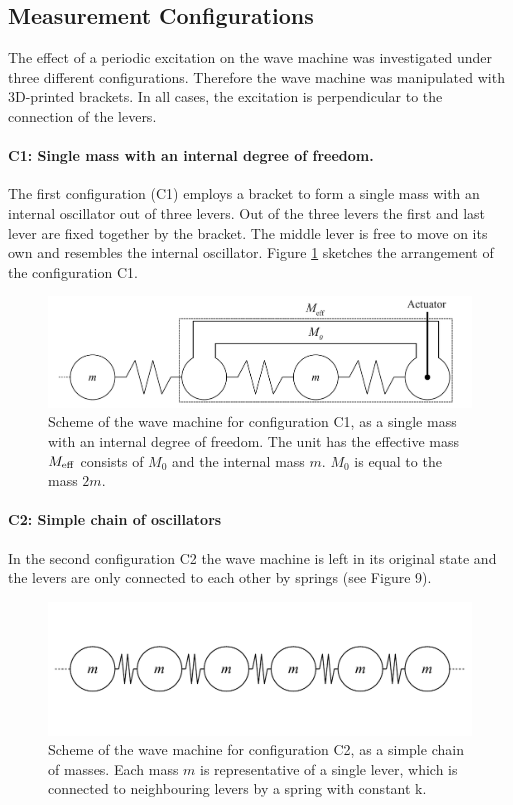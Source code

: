 \documentclass[12pt]{article}
\begin{document}
\subsection{Measurement Configurations}
The effect of a periodic excitation on the wave machine was investigated under three different configurations. Therefore the wave machine was manipulated with 3D-printed brackets. In all cases, the excitation is perpendicular to the connection of the levers.

\paragraph{C1: Single mass with an internal degree of freedom.} The first configuration (C1) employs a bracket to form a single mass with an internal oscillator out of three levers. Out of the three levers the first and last lever are fixed together by the bracket. The middle lever is free to move on its own and resembles the internal oscillator. Figure \ref{fig:figure9} sketches the arrangement of the configuration C1.
\begin{figure}[hbt]	
  \includegraphics[width=.7\columnwidth]{condition3}
  \caption{Scheme of the wave machine for configuration C1, as a single mass with an internal degree of freedom. The unit has the effective mass $M_{\rm eff}$ consists of $M_0$ and the internal mass $m$. $M_0$ is equal to the mass $2m$.}\label{fig:figure9}
\end{figure}
\paragraph{C2: Simple chain of oscillators}In the second configuration C2 the wave machine is left in its original state and the levers are only connected to each other by springs (see Figure 9).
\begin{figure}[h!]	
  \includegraphics[width=.7\columnwidth]{condition1}
  \caption{Scheme of the wave machine for configuration C2, as a simple chain of masses. Each mass $m$ is representative of a single lever, which is connected to neighbouring levers by a spring with constant k.}
\end{figure}
\end{document}
